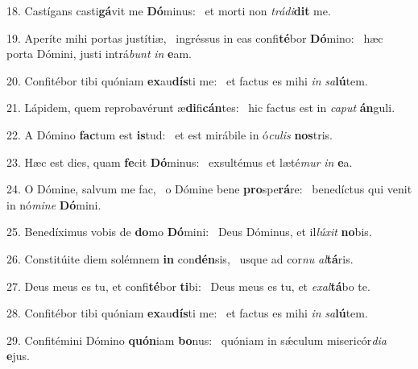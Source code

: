 18. Castígans casti\textbf{gá}vit me \textbf{Dó}minus: \ast\  et morti non \textit{trá}\textit{di}\textbf{dit} me.\

19. Aperíte mihi portas justítiæ, \dag\  ingréssus in eas confi\textbf{té}bor \textbf{Dó}mino: \ast\  hæc porta Dómini, justi intrá\textit{bunt} \textit{in} \textbf{e}am.\

20. Confitébor tibi quóniam \textbf{ex}au\textbf{dís}ti me: \ast\  et factus es mihi \textit{in} \textit{sa}\textbf{lú}tem.\

21. Lápidem, quem reprobavérunt æ\textbf{di}fi\textbf{cán}tes: \ast\  hic factus est in \textit{ca}\textit{put} \textbf{án}guli.\

22. A Dómino \textbf{fac}tum est \textbf{is}tud: \ast\  et est mirábile in ó\textit{cu}\textit{lis} \textbf{nos}tris.\

23. Hæc est dies, quam \textbf{fe}cit \textbf{Dó}minus: \ast\  exsultémus et læté\textit{mur} \textit{in} \textbf{e}a.\

24. O Dómine, salvum me fac, \dag\  o Dómine bene \textbf{pro}spe\textbf{rá}re: \ast\  benedíctus qui venit in nó\textit{mi}\textit{ne} \textbf{Dó}mini.\

25. Benedíximus vobis de \textbf{do}mo \textbf{Dó}mini: \ast\  Deus Dóminus, et il\textit{lú}\textit{xit} \textbf{no}bis.\

26. Constitúite diem solémnem \textbf{in} con\textbf{dén}sis, \ast\  usque ad cor\textit{nu} \textit{al}\textbf{tá}ris.\

27. Deus meus es tu, et confi\textbf{té}bor \textbf{ti}bi: \ast\  Deus meus es tu, et \textit{ex}\textit{al}\textbf{tá}bo te.\

28. Confitébor tibi quóniam \textbf{ex}au\textbf{dís}ti me: \ast\  et factus es mihi \textit{in} \textit{sa}\textbf{lú}tem.\

29. Confitémini Dómino \textbf{quón}iam \textbf{bo}nus: \ast\  quóniam in sǽculum misericór\textit{di}\textit{a} \textbf{e}jus.\

